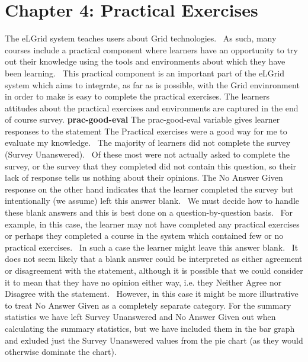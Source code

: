 \documentclass[12pt,twoside]{article}
\begin{document}
\section[Chapter 4: Practical Exercises ]{Chapter 4: Practical Exercises
}
\newline
The eLGrid system teaches users about Grid technologies.~ As such, many
courses include a practical component where learners have an
opportunity to try out their knowledge using the tools and environments
about which they have been learning.~ This practical component is an
important part of the eLGrid system which aims to integrate, as far as
is possible, with the Grid envinronment in order to make is easy to
complete the practical exercises.\newline
The learners attitudes about the practical exercises and environments
are captured in the end of course survey.\newline
\textbf{prac{}-good{}-eval\newline
}The prac{}-good{}-eval variable gives learner responses to the
statement {\textquotedbl}The Practical exercises were a good way for me
to evaluate my knowledge{\textquotedbl}.~ The majority of learners did
not complete the survey ({\textquotedbl}Survey
Unanswered{\textquotedbl}).~ Of these most were not actually asked to
complete the survey, or the survey that they completed did not contain
this question, so their lack of response tells us nothing about their
opinions.\newline
The {\textquotedbl}No Answer Given{\textquotedbl} response on the other
hand indicates that the learner completed the survey but intentionally
(we assume) left this answer blank.~ We must decide how to handle these
blank answers and this is best done on a question{}-by{}-question
basis.~ For example, in this case, the learner may not have completed
any practical exercises or perhaps they completed a course in the
system which contained few or no practical exercises.~ In such a case
the learner might leave this answer blank.~ It does not seem likely
that a blank answer could be interpreted as either agreement or
disagreement with the statement, although it is possible that we could
consider it to mean that they have no opinion either way, i.e. they
{\textquotedbl}Neither Agree nor Disagree{\textquotedbl} with the
statement.~ However, in this case it might be more illustrative to
treat {\textquotedbl}No Answer Given{\textquotedbl} as a completely
separate category.\newline
For the summary statistics we have left {\textquotedbl}Survey
Unanswered{\textquotedbl} and {\textquotedbl}No Answer
Given{\textquotedbl} out when calculating the summary statistics, but
we have included them in the bar graph and exluded just the
{\textquotedbl}Survey Unanswered{\textquotedbl} values from the pie
chart (as they would otherwise dominate the chart).
\end{document}
